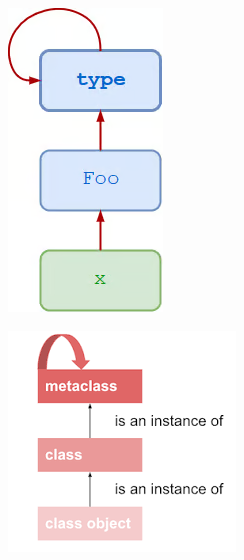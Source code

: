 \documentclass[10pt]{beamer}
\begin{document}
	
	
	\begin{frame}
		\begin{minipage}{.5\linewidth}
				\begin{figure}
				\centering
				\includegraphics[width=0.4\linewidth]{assets/type-loop}
				\caption{}
				\label{fig:type-loop}
			\end{figure}
		\end{minipage}
		\begin{minipage}{.5\linewidth}
			\begin{figure}
				\centering
				\includegraphics[width=0.7\linewidth]{assets/isinstanceof-loop}
				\caption{}
				\label{fig:isinstanceof-loop}
			\end{figure}
		\end{minipage}
	\end{frame}
	
\end{document}
